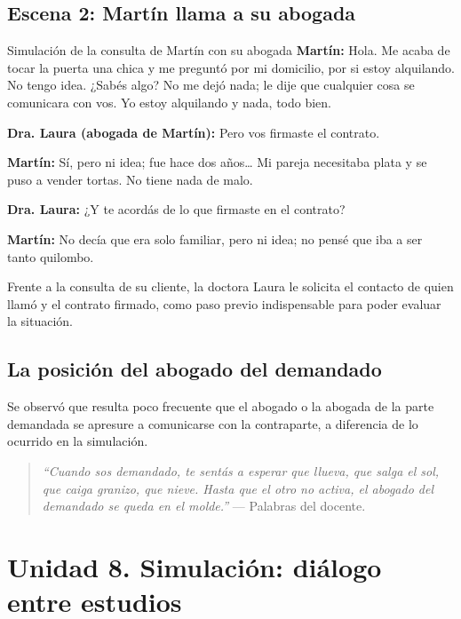 \documentclass[12pt,oneside]{book}
\begin{document}
\subsection*{Escena 2: Martín llama a su abogada}

\begin{example}{Simulación de la consulta de Martín con su abogada}
\textbf{Martín:} Hola. Me acaba de tocar la puerta una chica y me preguntó por mi domicilio, por si estoy alquilando. No tengo idea. ¿Sabés algo? No me dejó nada; le dije que cualquier cosa se comunicara con vos. Yo estoy alquilando y nada, todo bien.

\textbf{Dra. Laura (abogada de Martín):} Pero vos firmaste el contrato.

\textbf{Martín:} Sí, pero ni idea; fue hace dos años… Mi pareja necesitaba plata y se puso a vender tortas. No tiene nada de malo.

\textbf{Dra. Laura:} ¿Y te acordás de lo que firmaste en el contrato?

\textbf{Martín:} No decía que era solo familiar, pero ni idea; no pensé que iba a ser tanto quilombo.
\end{example}

Frente a la consulta de su cliente, la doctora Laura le solicita el contacto de quien llamó y el contrato firmado, como paso previo indispensable para poder evaluar la situación.

\subsection*{La posición del abogado del demandado}

Se observó que resulta poco frecuente que el abogado o la abogada de la parte demandada se apresure a comunicarse con la contraparte, a diferencia de lo ocurrido en la simulación.

\begin{quote}
\textit{``Cuando sos demandado, te sentás a esperar que llueva, que salga el sol, que caiga granizo, que nieve. Hasta que el otro no activa, el abogado del demandado se queda en el molde.''} --- Palabras del docente.
\end{quote}

\section*{Unidad 8. Simulación: diálogo entre estudios}
\end{document}
